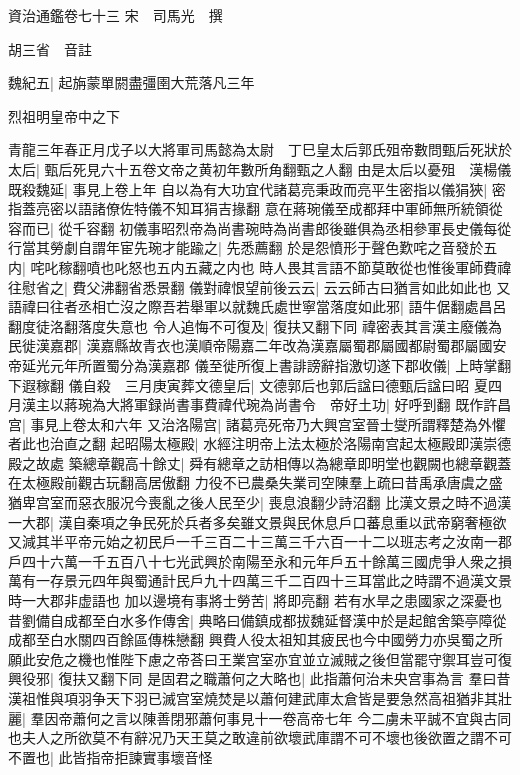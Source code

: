資治通鑑卷七十三
宋　司馬光　撰

胡三省　音註

魏紀五|{
	起旃蒙單閼盡彊圉大荒落凡三年}


烈祖明皇帝中之下

青龍三年春正月戊子以大將軍司馬懿為太尉　丁巳皇太后郭氏殂帝數問甄后死狀於太后|{
	甄后死見六十五卷文帝之黄初年數所角翻甄之人翻}
由是太后以憂殂　漢楊儀既殺魏延|{
	事見上卷上年}
自以為有大功宜代諸葛亮秉政而亮平生密指以儀狷狹|{
	密指蓋亮密以語諸僚佐特儀不知耳狷吉掾翻}
意在蔣琬儀至成都拜中軍師無所統領從容而已|{
	從千容翻}
初儀事昭烈帝為尚書琬時為尚書郎後雖俱為丞相參軍長史儀每從行當其勞劇自謂年宦先琬才能踰之|{
	先悉薦翻}
於是怨憤形于聲色歎咤之音發於五内|{
	咤叱稼翻噴也叱怒也五内五藏之内也}
時人畏其言語不節莫敢從也惟後軍師費禕往慰省之|{
	費父沸翻省悉景翻}
儀對禕恨望前後云云|{
	云云師古曰猶言如此如此也}
又語禕曰往者丞相亡沒之際吾若舉軍以就魏氏處世寧當落度如此邪|{
	語牛倨翻處昌呂翻度徒洛翻落度失意也}
令人追悔不可復及|{
	復扶又翻下同}
禕密表其言漢主廢儀為民徙漢嘉郡|{
	漢嘉縣故青衣也漢順帝陽嘉二年改為漢嘉屬蜀郡屬國都尉蜀郡屬國安帝延光元年所置蜀分為漢嘉郡}
儀至徙所復上書誹謗辭指激切遂下郡收儀|{
	上時掌翻下遐稼翻}
儀自殺　三月庚寅葬文德皇后|{
	文德郭后也郭后諡曰德甄后諡曰昭}
夏四月漢主以蔣琬為大將軍録尚書事費禕代琬為尚書令　帝好土功|{
	好呼到翻}
既作許昌宫|{
	事見上卷太和六年}
又治洛陽宫|{
	諸葛亮死帝乃大興宫室晉士燮所謂釋楚為外懼者此也治直之翻}
起昭陽太極殿|{
	水經注明帝上法太極於洛陽南宫起太極殿即漢崇德殿之故處}
築總章觀高十餘丈|{
	舜有總章之訪相傳以為總章即明堂也觀闕也總章觀蓋在太極殿前觀古玩翻高居傲翻}
力役不已農桑失業司空陳羣上疏曰昔禹承唐虞之盛猶卑宫室而惡衣服况今喪亂之後人民至少|{
	喪息浪翻少詩沼翻}
比漢文景之時不過漢一大郡|{
	漢自秦項之争民死於兵者多矣雖文景與民休息戶口蕃息重以武帝窮奢極欲又減其半平帝元始之初民戶一千三百二十三萬三千六百一十二以班志考之汝南一郡戶四十六萬一千五百八十七光武興於南陽至永和元年戶五十餘萬三國虎爭人衆之損萬有一存景元四年與蜀通計民戶九十四萬三千二百四十三耳當此之時謂不過漢文景時一大郡非虚語也}
加以邊境有事將士勞苦|{
	將即亮翻}
若有水旱之患國家之深憂也昔劉備自成都至白水多作傳舍|{
	典略曰備鎮成都拔魏延督漢中於是起館舍築亭障從成都至白水關四百餘區傳株戀翻}
興費人役太祖知其疲民也今中國勞力亦吳蜀之所願此安危之機也惟陛下慮之帝荅曰王業宫室亦宜並立滅賊之後但當罷守禦耳豈可復興役邪|{
	復扶又翻下同}
是固君之職蕭何之大略也|{
	此指蕭何治未央宫事為言}
羣曰昔漢祖惟與項羽争天下羽已滅宫室燒焚是以蕭何建武庫太倉皆是要急然高祖猶非其壯麗|{
	羣因帝蕭何之言以陳善閉邪蕭何事見十一卷高帝七年}
今二虜未平誠不宜與古同也夫人之所欲莫不有辭况乃天王莫之敢違前欲壞武庫謂不可不壞也後欲置之謂不可不置也|{
	此皆指帝拒諫實事壞音怪}
